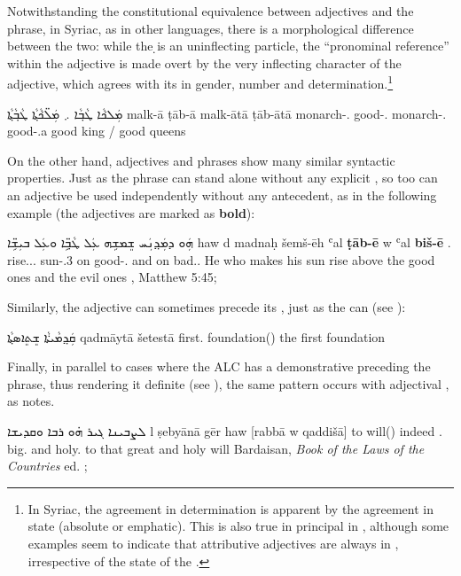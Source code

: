 {{{{Notwithstanding the constitutional equivalence between adjectives and the \lnk* phrase, in Syriac, as in other  languages, there is a morphological difference between the two: while  the \d \lnk*  is an uninflecting particle, the \enquote{pronominal reference} within the adjective is made overt by the very inflecting character of the adjective, which agrees with its \prim in gender, number and determination.\footnote{In Syriac, the agreement in determination is apparent by the agreement in state (absolute or emphatic). This is also true in principal in \JBA, although some examples seem to indicate that attributive adjectives are always in \emp*, irrespective of the state of the \prim \citep[64]{BarAsherJBA}.}

{ܡܲܠܟ݁ܵܐ ܛܵܒ݂ܵܐ ܇ ܡܲܠ̈ܟ݁ܵܬ݂ܵܐ ܛܵܒ݂ܵܬ݂ܵܐ}
{malk-ā ṭāb-ā \linebreak malk-ātā ṭāb-ātā}
{monarch-\masc.\emp{} good-\masc.\emp{} \linebreak monarch-\fpl.\emp{} good-\fpl.\emp}{a good king / good queens}
{\cite[72, \S 92.1]{MuraokaSyriac}}


On the other hand, adjectives and \lnk* phrases show many similar syntactic properties. Just as the \lnk* phrase can stand alone without any explicit \prim, so too can an adjective be used independently without any antecedent, as in the following example (the adjectives are marked as \textbf{bold}):

{ܗܲܘ ܕܡܲܕ݂ܢܲܚ ܫܸܡܫܹܗ ܥܲܠ ܛܵܒ݂ܹ̈ܐ ܘܥܲܠ ܒܝܼܫܹ̈ܐ}
{haw d\cb{} madnaḥ šemš-ēh ʿal \textbf{ṭāb-ē} w\cb{} ʿal \textbf{biš-ē}}
{\dem.\masc{} \lnk\cb{} rise.\caus.\ptcp.\masc{} sun-\poss.3\masc{} on {good-\mpl.\emp}{} and\cb{} on {bad.\mpl{}.\emp}}
{He who makes his sun rise above the good ones and the evil ones}
{\Pesh, Matthew 5:45; \cite[76, \S 96d]{MuraokaSyriac}}

Similarly, the adjective can sometimes precede its \prim, just as the \lnk* can (see ):

{ܩܲܕ݂ܡܵܝܬ݁ܵܐ ܫܸܬܸܐܣܬ݂ܵܐ}
{qadmāytā šetestā}
{first.\fem{} foundation(\fem)}
{the first foundation}
{\cite[69, \S 91a]{MuraokaSyriac}}


Finally, in parallel to cases where the ALC has a demonstrative preceding the \lnk* phrase, thus rendering it definite (see ), the same pattern occurs with adjectival \secns, as \citet[66--67]{PatElCorrelative} notes. 

{ܠܨܒܝܢܐ ܓܝܪ ܗ̇ܘ ܪܒܐ ܘܩܕܝܫܐ}
{l\cb{} ṣebyānā \cb{}gēr haw [rabbā w\cb{} qaddišā]}
{to\cb{} will(\masc) \cb{}indeed \dem.\masc{} big.\masc{} and\cb{} holy.\masc{}}
{to that great and holy will}
{Bardaisan, \textit{Book of the Laws of the Countries} ed. \cite[62:2--3]{Drijvers} \apud \cite[137]{BakkerBardaisan}; \cite[67]{PatElCorrelative}}

}}}}
